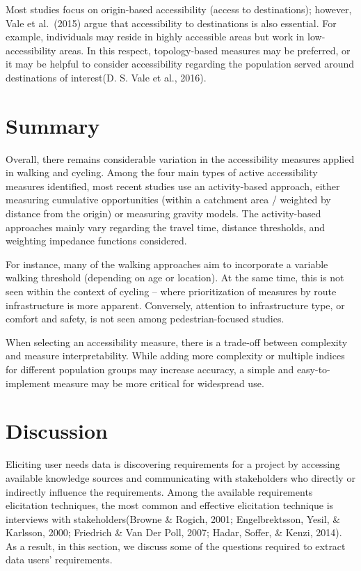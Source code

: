 \documentclass[
11pt, %
oneside, %
english, %
singlespacing, %
]{macthesis} %
\begin{document}
Most studies focus on origin-based accessibility (access to destinations); however, Vale et al.~(2015) argue that accessibility to destinations is also essential. For example, individuals may reside in highly accessible areas but work in low-accessibility areas. In this respect, topology-based measures may be preferred, or it may be helpful to consider accessibility regarding the population served around destinations of interest(D. S. Vale et al., 2016).

\hypertarget{summary}{%
\section{Summary}\label{summary}}

Overall, there remains considerable variation in the accessibility measures applied in walking and cycling. Among the four main types of active accessibility measures identified, most recent studies use an activity-based approach, either measuring cumulative opportunities (within a catchment area / weighted by distance from the origin) or measuring gravity models. The activity-based approaches mainly vary regarding the travel time, distance thresholds, and weighting impedance functions considered.

For instance, many of the walking approaches aim to incorporate a variable walking threshold (depending on age or location). At the same time, this is not seen within the context of cycling -- where prioritization of measures by route infrastructure is more apparent. Conversely, attention to infrastructure type, or comfort and safety, is not seen among pedestrian-focused studies.

When selecting an accessibility measure, there is a trade-off between complexity and measure interpretability. While adding more complexity or multiple indices for different population groups may increase accuracy, a simple and easy-to-implement measure may be more critical for widespread use.

\hypertarget{discussion}{%
\section{Discussion}\label{discussion}}

Eliciting user needs data is discovering requirements for a project by accessing available knowledge sources and communicating with stakeholders who directly or indirectly influence the requirements. Among the available requirements elicitation techniques, the most common and effective elicitation technique is interviews with stakeholders(Browne \& Rogich, 2001; Engelbrektsson, Yesil, \& Karlsson, 2000; Friedrich \& Van Der Poll, 2007; Hadar, Soffer, \& Kenzi, 2014). As a result, in this section, we discuss some of the questions required to extract data users' requirements.
\end{document}
